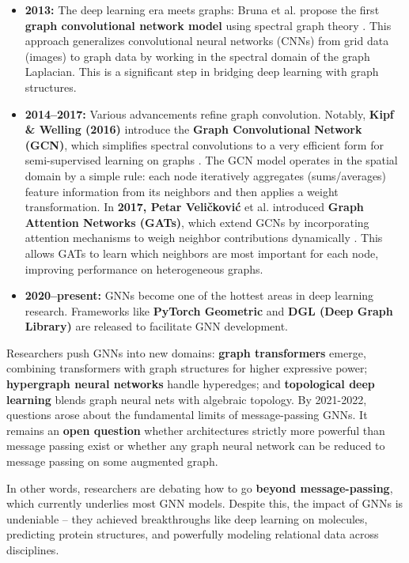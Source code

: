 \documentclass{article}
\begin{document}
\begin{itemize}
      \item \textbf{2013:} The deep learning era meets graphs: Bruna et al. propose the first \textbf{graph convolutional network model} using spectral graph theory \cite{bruna2013spectral}. This approach generalizes convolutional neural networks (CNNs) from grid data (images) to graph data by working in the spectral domain of the graph Laplacian. This is a significant step in bridging deep learning with graph structures.
      \item \textbf{2014–2017:} Various advancements refine graph convolution. Notably, \textbf{Kipf \& Welling (2016)} introduce the \textbf{Graph Convolutional Network (GCN)}, which simplifies spectral convolutions to a very efficient form for semi-supervised learning on graphs \cite{kipf2017semigcn}. The GCN model operates in the spatial domain by a simple rule: each node iteratively aggregates (sums/averages) feature information from its neighbors and then applies a weight transformation. In \textbf{2017, Petar Veličković} et al. introduced \textbf{Graph Attention Networks (GATs)}, which extend GCNs by incorporating attention mechanisms to weigh neighbor contributions dynamically \cite{veličković2018graphattentionnetworks}. This allows GATs to learn which neighbors are most important for each node, improving performance on heterogeneous graphs.
      \item \textbf{2020–present:} GNNs become one of the hottest areas in deep learning research. Frameworks like \textbf{PyTorch Geometric} \cite{pytorch_geometric} and \textbf{DGL (Deep Graph Library)} \cite{dgl} are released to facilitate GNN development.

\end{itemize}

Researchers push GNNs into new domains: \textbf{graph transformers} emerge, combining transformers with graph structures for higher expressive power;
\textbf{hypergraph neural networks} handle hyperedges;
and \textbf{topological deep learning} blends graph neural nets with algebraic topology.
By 2021-2022, questions arose about the fundamental limits of message-passing GNNs. It remains an \textbf{open question} whether architectures strictly more powerful than message passing exist or whether any graph neural network can be reduced to message passing on some augmented graph.

In other words, researchers are debating how to go \textbf{beyond message-passing}, which currently underlies most GNN models.
Despite this, the impact of GNNs is undeniable – they achieved breakthroughs like deep learning on molecules, predicting protein structures, and powerfully modeling relational data across disciplines.
\end{document}
